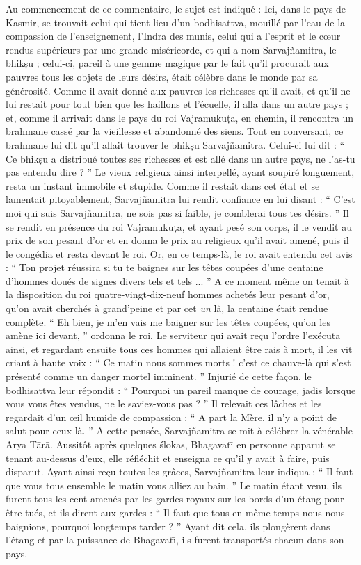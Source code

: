 \documentclass[a4paper, 11pt, oneside, french]{article}
\begin{document}
Au commencement de ce commentaire, le sujet est indiqué : Ici, dans le pays de Kasmir, se trouvait celui qui tient lieu d'un bodhisattva, mouillé par l'eau de la compassion de l'enseignement, l'Indra des munis, celui qui a l'esprit et le cœur rendus supérieurs par une grande miséricorde, et qui a nom Sarvaj\~{n}amitra, le bhik\d{s}u ; celui-ci, pareil à une gemme magique par le fait qu'il procurait aux pauvres tous les objets de leurs désirs, était célèbre dans le monde par sa générosité. Comme il avait donné aux pauvres les richesses qu'il avait, et qu'il ne lui restait pour tout bien que les haillons et l'écuelle, il alla dans un autre pays ; et, comme il arrivait dans le pays du roi Vajramuku\d{t}a, en chemin, il rencontra un brahmane cassé par la vieillesse et abandonné des siens. Tout en conversant, ce brahmane lui dit qu'il allait trouver le bhik\d{s}u Sarvaj\~{n}amitra. Celui-ci lui dit : `` Ce bhik\d{s}u a distribué toutes ses richesses et est allé dans un autre pays, ne l'as-tu pas entendu dire ? '' Le vieux religieux ainsi interpellé, ayant soupiré longuement, resta un instant immobile et stupide. Comme il restait dans cet état et se lamentait pitoyablement, Sarvaj\~{n}amitra lui rendit confiance en lui disant : `` C'est moi qui suis Sarvaj\~{n}amitra, ne sois pas si faible, je comblerai tous tes désirs. '' Il se rendit en présence du roi Vajramuku\d{t}a, et ayant pesé son corps, il le vendit au prix de son pesant d'or et en donna le prix au religieux qu'il avait amené, puis il le congédia et resta devant le roi. Or, en ce temps-là, le roi avait entendu cet avis : `` Ton projet réussira si tu te baignes sur les têtes coupées d'une centaine d'hommes doués de signes divers tels et tels ... '' A ce moment même on tenait à la disposition du roi quatre-vingt-dix-neuf hommes achetés leur pesant d'or, qu'on avait cherchés à grand'peine et par cet \emph{un} là, la centaine était rendue complète. `` Eh bien, je m'en vais me baigner sur les têtes coupées, qu'on les amène ici devant, '' ordonna le roi. Le serviteur qui avait reçu l'ordre l'exécuta ainsi, et regardant ensuite tous ces hommes qui allaient être rais à mort, il les vit criant à haute voix : `` Ce matin nous sommes morts ! c'est ce chauve-là qui s'est présenté comme un danger mortel imminent. '' Injurié de cette façon, le bodhisattva leur répondit : `` Pourquoi un pareil manque de courage, jadis lorsque vous vous êtes vendus, ne le saviez-vous pas ? '' Il relevait ces lâches et les regardait d'un œil humide de compassion : `` A part la Mère, il n'y a point de salut pour ceux-là. '' A cette pensée, Sarvaj\~{n}amitra se mit à célébrer la vénérable \={A}rya T\={a}r\={a}. Aussitôt après quelques \'{s}lokas, Bhagavat\={\i} en personne apparut se tenant au-dessus d'eux, elle réfléchit et enseigna ce qu'il y avait à faire, puis disparut. Ayant ainsi reçu toutes les grâces, Sarvaj\~{n}amitra leur indiqua : `` Il faut que vous tous ensemble le matin vous alliez au bain. '' Le matin étant venu, ils furent tous les cent amenés par les gardes royaux sur les bords d'un étang pour être tués, et ils dirent aux gardes : `` Il faut que tous en même temps nous nous baignions, pourquoi longtemps tarder ? '' Ayant dit cela, ils plongèrent dans l'étang et par la puissance de Bhagavat\={\i}, ils furent transportés chacun dans son pays. 
\end{document}
